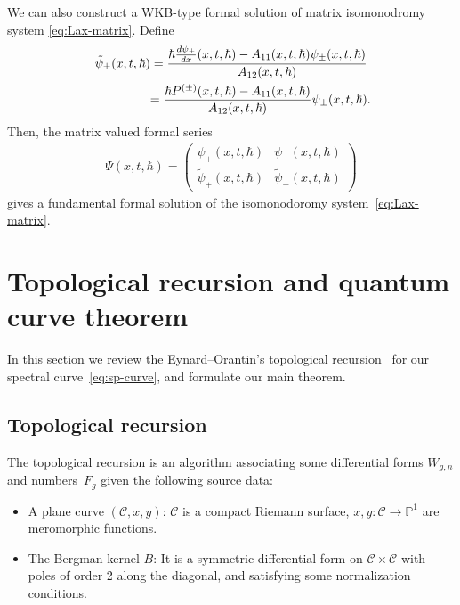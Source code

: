 \begin{rem}
We can also construct a WKB-type formal solution
of matrix isomonodromy system \eqref{eq:Lax-matrix}.
Def\/ine
\begin{gather*}
\tilde{\psi}_{\pm}(x,t,\hbar)   =
\frac{ \hbar \frac{d \psi_{\pm}}{dx}(x,t,\hbar) - A_{11}(x,t,\hbar)
\psi_{\pm}(x,t,\hbar)}{A_{12}(x,t,\hbar)}  \\
\hphantom{\tilde{\psi}_{\pm}(x,t,\hbar) }{}
  =
\frac{\hbar P^{(\pm)}(x,t,\hbar) - A_{11}(x,t,\hbar)}
{A_{12}(x,t,\hbar)} \psi_{\pm}(x,t,\hbar).
\end{gather*}
Then, the matrix valued formal series
\begin{gather} \label{eq:WKB-IM-mat}
\Psi(x,t,\hbar)   =
\begin{pmatrix}
\psi_{+}(x,t,\hbar) & \psi_{-}(x,t,\hbar) \\[+.7em]
\tilde{\psi}_{+}(x,t,\hbar) & \tilde{\psi}_{-}(x,t,\hbar)
\end{pmatrix}
\end{gather}
gives a fundamental formal solution of the
isomonodoromy system~\eqref{eq:Lax-matrix}.
\end{rem}

\section{Topological recursion and quantum curve theorem}\label{section3}

In this section we review the Eynard--Orantin's
topological recursion~\cite{EO07} for our
spectral cur\-ve~\eqref{eq:sp-curve},
and formulate our main theorem.

\subsection{Topological recursion}
\label{section:top-recursion}

The topological recursion is an algorithm associating some
dif\/ferential forms $W_{g,n}$ and num\-bers~$F_{g}$
given the following source data:
\begin{itemize}\itemsep=0pt
\item
A plane curve $({\mathcal C}, x, y)$: ${\mathcal C}$ is a
compact Riemann surface, $x, y\colon {\mathcal C} \rightarrow {\mathbb P}^{1}$
are meromorphic functions.
\item
The Bergman kernel $B$:
It is a symmetric dif\/ferential form on ${\mathcal C} \times {\mathcal C}$
with poles of order 2 along the diagonal, and
satisfying some normalization conditions.
\end{itemize}


